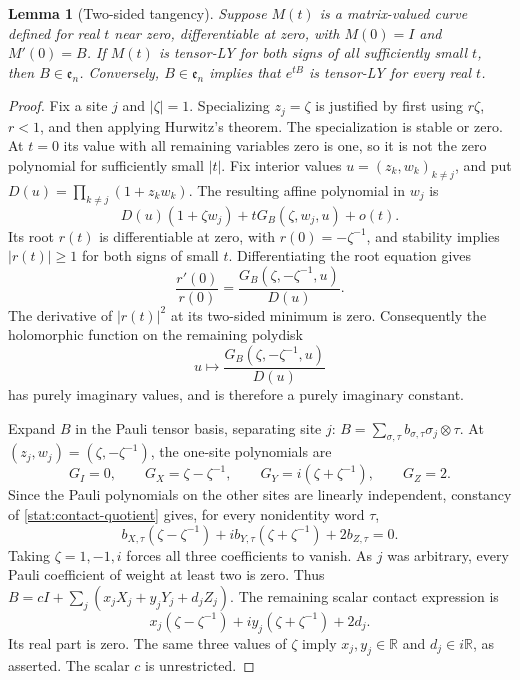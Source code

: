 \documentclass[reqno]{amsart}
\newtheorem{lemma}[theorem]{Lemma}
\theoremstyle{definition}
\theoremstyle{remark}
\newcommand{\R}{\mathbb R}
\begin{document}
\begin{lemma}[Two-sided tangency]
\label{stat:edge}
Suppose \(M(t)\) is a matrix-valued curve defined for real \(t\) near
zero, differentiable at zero, with \(M(0)=I\) and \(M'(0)=B\).
If \(M(t)\) is tensor-LY for both signs of all sufficiently small
\(t\), then \(B\in\mathfrak e_n\).
Conversely, \(B\in\mathfrak e_n\) implies that \(e^{tB}\) is
tensor-LY for every real \(t\).
\end{lemma}

\begin{proof}
Fix a site \(j\) and \(|\zeta|=1\).  Specializing \(z_j=\zeta\)
is justified by first using \(r\zeta\), \(r<1\), and then applying
Hurwitz's theorem.  The specialization is stable or zero.  At \(t=0\)
its value with all remaining variables zero is one, so it is not the
zero polynomial for sufficiently small \(|t|\).
Fix interior values \(u=(z_k,w_k)_{k\ne j}\), and put
\(D(u)=\prod_{k\ne j}(1+z_kw_k)\).  The resulting affine polynomial
in \(w_j\) is
\[
 D(u)(1+\zeta w_j)+tG_B(\zeta,w_j,u)+o(t).
\]
Its root \(r(t)\) is differentiable at zero, with
\(r(0)=-\zeta^{-1}\), and stability implies \(|r(t)|\ge1\) for
both signs of small \(t\).  Differentiating the root equation gives
\[
 \frac{r'(0)}{r(0)}
 =\frac{G_B(\zeta,-\zeta^{-1},u)}{D(u)}.
\]
The derivative of \(|r(t)|^2\) at its two-sided minimum is zero.
Consequently the holomorphic function on the remaining polydisk
\begin{equation}
 u\longmapsto\frac{G_B(\zeta,-\zeta^{-1},u)}{D(u)}
 \label{stat:contact-quotient}
\end{equation}
has purely imaginary values, and is therefore a purely imaginary
constant.

Expand \(B\) in the Pauli tensor basis, separating site \(j\):
\(B=\sum_{\sigma,\tau}b_{\sigma,\tau}\sigma_j\otimes\tau\).
At \((z_j,w_j)=(\zeta,-\zeta^{-1})\), the one-site polynomials are
\[
 G_I=0,\qquad G_X=\zeta-\zeta^{-1},\qquad
 G_Y=i(\zeta+\zeta^{-1}),\qquad G_Z=2.
\]
Since the Pauli polynomials on the other sites are linearly independent,
constancy of \eqref{stat:contact-quotient} gives, for every nonidentity
word \(\tau\),
\[
 b_{X,\tau}(\zeta-\zeta^{-1})
 +ib_{Y,\tau}(\zeta+\zeta^{-1})+2b_{Z,\tau}=0.
\]
Taking \(\zeta=1,-1,i\) forces all three coefficients to vanish.
As \(j\) was arbitrary, every Pauli coefficient of weight at least
two is zero.  Thus
\(B=cI+\sum_j(x_jX_j+y_jY_j+d_jZ_j)\).
The remaining scalar contact expression is
\[
 x_j(\zeta-\zeta^{-1})+iy_j(\zeta+\zeta^{-1})+2d_j.
\]
Its real part is zero.  The same three values of \(\zeta\) imply
\(x_j,y_j\in\R\) and \(d_j\in i\R\), as asserted.  The scalar
\(c\) is unrestricted.


\end{proof}
\end{document}
